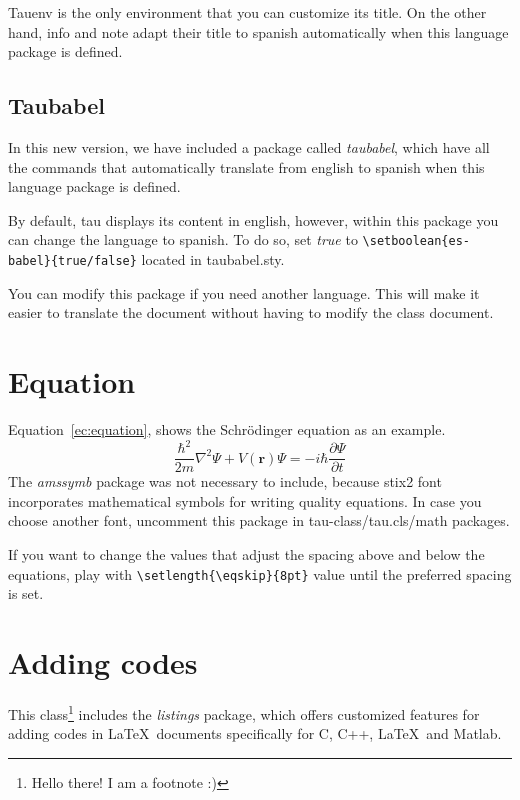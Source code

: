 \documentclass[9pt,a4paper,twoside]{tau-class/tau}
\begin{document}
        Tauenv is the only environment that you can customize its title. On the other hand, info and note adapt their title to spanish automatically when this language package is defined.
		
    \subsection{Taubabel}

        In this new version, we have included a package called \textit{taubabel}, which have all the commands that automatically translate from english to spanish when this language package is defined.
		
        By default, tau displays its content in english, however, within this package you can change the language to spanish. To do so, set \textit{true} to \verb|\setboolean{es-babel}{true/false}| located in taubabel.sty.
		
        You can modify this package if you need another language. This will make it easier to translate the document without having to modify the class document.
		
\section{Equation}

    Equation~\ref{ec:equation}, shows the Schrödinger equation as an example. 
	\begin{equation} \label{ec:equation}
		\frac{\hbar^2}{2m}\nabla^2\Psi + V(\mathbf{r})\Psi = -i\hbar \frac{\partial\Psi}{\partial t}
	\end{equation} 
    The \textit{amssymb} package was not necessary to include, because stix2 font incorporates mathematical symbols for writing quality equations. In case you choose another font, uncomment this package in tau-class/tau.cls/math packages.
	
    If you want to change the values that adjust the spacing above and below the equations, play with \verb|\setlength{\eqskip}{8pt}| value until the preferred spacing is set.
	
\section{Adding codes}
	
    This class\footnote{Hello there! I am a footnote :)} includes the \textit{listings} package, which offers customized features for adding codes in \LaTeX\ documents specifically for C, C++, \LaTeX\ and Matlab. 
	
\end{document}
